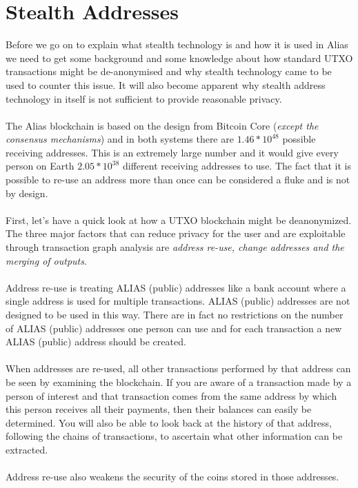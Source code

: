 \section{Stealth Addresses}
Before we go on to explain what stealth technology is and how it is used in
Alias we need to get some background and some knowledge about how
standard UTXO transactions might be de-anonymised and why stealth technology
came to be used to counter this issue. It will also become apparent why
stealth address technology in itself is not sufficient to provide reasonable
privacy.
\\
\\
\noindent
The Alias blockchain is based on the design from Bitcoin Core 
(\textit{except the consensus mechanisms}) and in both systems there are 
$1.46 \ast 10^{48}$ possible receiving addresses. This is an extremely 
large number and it would give every person on Earth $2.05 \ast 10^{38}$ 
different receiving addresses to use. The fact that it is possible
to re-use an address more than once can be considered a fluke and is not by
design.
\\
\\
\noindent
First, let’s have a quick look at how a UTXO blockchain might be deanonymized.
The three major factors that can reduce privacy for the user and are exploitable
through transaction graph analysis are \textit{address re-use, change addresses 
and the merging of outputs}.
\\
\\
\noindent
Address re-use is treating ALIAS (public) addresses like a bank account where a single
address is used for multiple transactions. ALIAS (public) addresses are not designed to
be used in this way. There are in fact no restrictions on the number of ALIAS (public)
addresses one person can use and for each transaction a new ALIAS (public) address should
be created.
\\
\\
\noindent
When addresses are re-used, all other transactions performed by that address
can be seen by examining the blockchain. If you are aware of a transaction
made by a person of interest and that transaction comes from the same address
by which this person receives all their payments, then their balances can
easily be determined. You will also be able to look back at the history of
that address, following the chains of transactions, to ascertain what other
information can be extracted.
\\
\\
\noindent
Address re-use also weakens the security of the coins stored in those addresses.
